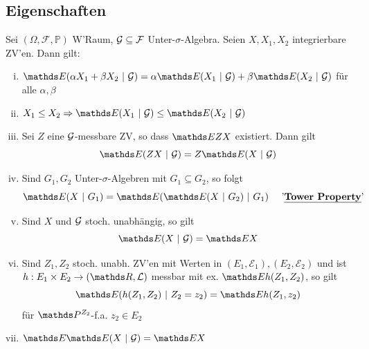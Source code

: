 \newpage

\subsection{Eigenschaften}
\label{sub:eigenschaften}
Sei $(\Omega,\mathcal{F},\mathds{P})$ W'Raum, $\mathcal{G}\subseteq \mathcal{F}$ Unter-$\sigma$-Algebra. Seien $X,X_1,X_2$ integrierbare ZV'en. Dann gilt:
\begin{enumerate}[(i)]
	\item $\E(\alpha X_1+\beta X_2~|~\G)=\alpha\E(X_1~|~\G)+\beta \E(X_2~|~\G)$ für alle $\alpha,\beta$
	\item $X_1\le X_2 \Rightarrow \E(X_1~|~\G)\le \E(X_2~|~\G)$
	\item Sei $Z$ eine $\mathcal{G}$-messbare ZV, so dass $\E ZX$ existiert. Dann gilt \[ \E(ZX~|~\G)=Z\E(X~|~\G)\]
	\item Sind $G_1,G_2$ Unter-$\sigma$-Algebren mit $G_1\subseteq G_2$, so folgt \[\E(X~|~G_1)=\E(\E(X~|~G_2)~|~G_1)\quad \text{ '\Index{Tower Property}'} \]
	\item Sind $X$ und $\mathcal{G}$ stoch. unabhängig, so gilt \[\E(X~|~\G)=\E X \]
	\item Sind $Z_1,Z_2$ stoch. unabh. ZV'en mit Werten in $(E_1,\mathcal{E}_1),(E_2,\mathcal{E}_2)$ und ist $h:E_1\times E_2 \to (\R,\mathcal{L})$ messbar mit ex. $\E h(Z_1,Z_2)$, so gilt \[\E(h(Z_1,Z_2)~|~Z_2=z_2)= \E h(Z_1,z_2)  \]
	für $\Pw^{Z_2}$-f.a. $z_2\in E_2$
	\item $\E \E(X~|~\G)=\E X$
\end{enumerate}

